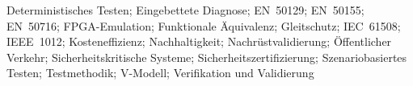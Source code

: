Deterministisches Testen; Eingebettete Diagnose; EN~50129; EN~50155; EN~50716; FPGA-Emulation; Funktionale Äquivalenz; Gleitschutz; IEC~61508; IEEE~1012; Kosteneffizienz; Nachhaltigkeit; Nachrüstvalidierung; Öffentlicher Verkehr; Sicherheitskritische Systeme; Sicherheitszertifizierung; Szenariobasiertes Testen; Testmethodik; V-Modell; Verifikation und Validierung